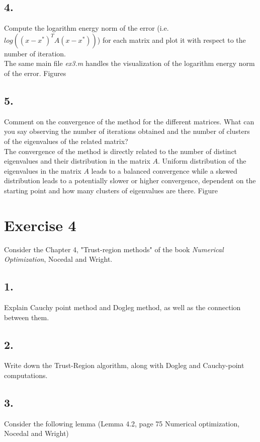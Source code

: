 \documentclass[unicode,11pt,a4paper,oneside,numbers=endperiod,openany]{scrartcl}
\begin{document}
\subsection*{4.}
Compute the logarithm energy norm of the error (i.e. $log((x - x^*)^T A(x - x^*))$)
for each matrix and plot it with respect to the number of iteration.\\

The same main file \textit{ex3.m} handles the visualization of the logarithm energy norm
of the error.
Figures %

\subsection*{5.}
Comment on the convergence of the method for the different matrices.
What can you say observing the number of iterations obtained
and the number of clusters of the eigenvalues of the related matrix?\\

The convergence of the method is directly related to the number of distinct eigenvalues
and their distribution in the matrix $A$.
Uniform distribution of the eigenvalues in the matrix $A$ leads to a balanced convergence
while a skewed distribution leads to a potentially slower or higher convergence,
dependent on the starting point and how many clusters of eigenvalues are there.
Figure %

\clearpage
\section*{Exercise 4}
Consider the Chapter 4, "Trust-region methods" of the book \textit{Numerical Optimization},
Nocedal and Wright.

\subsection*{1.}
Explain  Cauchy point method and Dogleg method, as well as the connection between them.

\subsection*{2.}
Write down the Trust-Region algorithm, along with Dogleg and Cauchy-point computations.

\subsection*{3.}
Consider the following lemma (Lemma 4.2, page 75 Numerical optimization, Nocedal and Wright)
\end{document}
